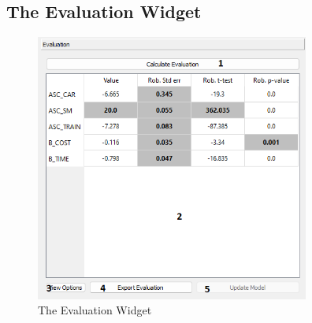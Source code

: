 \documentclass{article}
\begin{document}
\subsection{The Evaluation Widget} \label{sec:evaluation}
\begin{figure}[H]%
  \centering
  \includegraphics[width=9cm]{docs/User Manual/img/newEval.png}
  \caption{The Evaluation Widget}
  \label{fig:evaluation} 
\end{figure}
\end{document}
